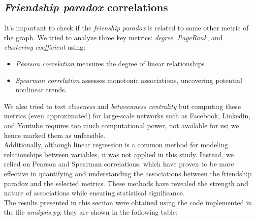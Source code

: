 \documentclass{article}
\begin{document}
\subsection{\textit{Friendship paradox} correlations}

It's important to check if the \textit{frienship paradox} is related to some other metric of the graph. We tried to analyze three key metrics: \textit{degree}, \textit{PageRank}, and \textit{clustering coefficient} using:
\begin{itemize}
    \item \textit{Pearson correlation} measures the degree of linear relationships
    \item \textit{Spearman correlation} assesses monotonic associations, uncovering potential nonlinear trends.
\end{itemize}
We also tried to test \textit{closeness} and \textit{betweenness centrality} but computing these metrics (even approximated) for large-scale networks such as Facebook, Linkedin, and Youtube requires too much computational power, not available for us; we hence marked them as unfeasible. \\
Additionally, although linear regression is a common method for modeling relationships between variables, it was not applied in this study.
Instead, we relied on Pearson and Spearman correlations, which have proven to be more effective in quantifying and understanding the associations between the friendship paradox and the selected metrics. These methods have revealed the strength and nature of associations while ensuring statistical significance. \\
The results presented in this section were obtained using the code implemented in the file \textit{analysis.py}; they are shown in the following table: \\
\end{document}
